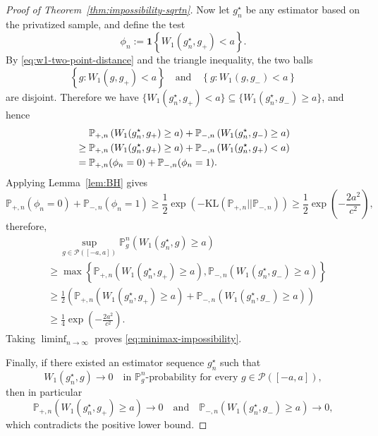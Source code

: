\documentclass[english, 11pt]{article}
\theoremstyle{plain}
\theoremstyle{definition}
\theoremstyle{remark}
\begin{document}
\begin{appendix}
\begin{proof}[Proof of Theorem~\ref{thm:impossibility-sqrtn}]
Now let $g_n^\star$ be any estimator based on the privatized sample, and define the test
\begin{equation*}
\phi_n:= \mathbf 1 \left\{W_1(g_n^\star,g_+)<a\right\}.
\end{equation*}
By \eqref{eq:w1-two-point-distance} and the triangle inequality, the two balls
\begin{equation*}
\left\{g:W_1(g,g_+)<a\right\} \quad\text{and}\quad \left\{g:W_1(g,g_-)<a\right\}
\end{equation*}
are disjoint. Therefore we have $\{W_1(g_n^\star,g_+)<a\}\subseteq\{W_1(g_n^\star,g_-)\ge a\}$, and hence
\begin{align}
&\quad\ \mathbb P_{+,n}\left(W_1(g_n^\star,g_+)\ge a\right)+\mathbb P_{-,n}\left(W_1(g_n^\star,g_-)\ge a\right) \notag\\
& \ge \mathbb P_{+,n}\left(W_1(g_n^\star,g_+)\ge a\right)+\mathbb P_{-,n}\left(W_1(g_n^\star,g_+)<a\right)\notag\\
& = \mathbb P_{+,n}(\phi_n=0)+\mathbb P_{-,n}(\phi_n=1). \notag
\end{align}
Applying Lemma~\ref{lem:BH} gives
\begin{equation*}
\mathbb P_{+,n}(\phi_n=0)+\mathbb P_{-,n}(\phi_n=1)\ge \frac12\exp \left(-\mathrm{KL}(\mathbb P_{+,n} || \mathbb P_{-,n})\right) \ge \frac12\exp \left(-\frac{2a^2}{c^2}\right),
\end{equation*}
therefore,
\begin{align*}
&\quad\ \sup_{g\in\mathcal P([-a,a])}
\mathbb P_{g}^{n} \left(W_1(g_n^\star,g)\ge a\right) \\
&\ge \max \left\{ \mathbb P_{+,n} \left(W_1(g_n^\star,g_+)\ge a\right), \mathbb P_{-,n} \left(W_1(g_n^\star,g_-)\ge a\right) \right\} \\
&\ge \frac12 \left(\mathbb P_{+,n}\left(W_1(g_n^\star,g_+)\ge a\right)+\mathbb P_{-,n}\left(W_1(g_n^\star,g_-)\ge a\right)\right) \\
&\ge \frac14\exp \left(-\frac{2a^2}{c^2}\right).
\end{align*}
Taking $\liminf_{n\to\infty}$ proves \eqref{eq:minimax-impossibility}.

Finally, if there existed an estimator sequence $g_n^\star$ such that
\begin{equation*}
W_1(g_n^\star,g)\to0 \quad\text{in }\mathbb P_{g}^{n}\text{-probability for every }g\in\mathcal P([-a,a]),
\end{equation*}
then in particular
\begin{equation*}
\mathbb P_{+,n} \left(W_1(g_n^\star,g_+)\ge a\right)\to 0 \quad\text{and}\quad \mathbb P_{-,n} \left(W_1(g_n^\star,g_-)\ge a\right)\to 0,
\end{equation*}
which contradicts the positive lower bound. 
\end{proof}
\end{appendix}
\end{document}

